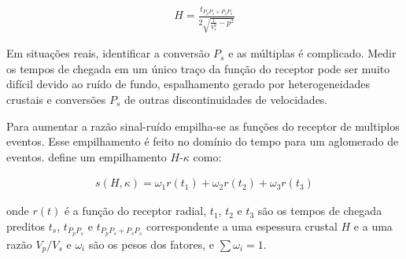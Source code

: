 \begin{eqnarray}
H = \frac{t_{P_{p}P_{s}+P_{s}P_{s}}}{{2\sqrt{\frac{1}{V_{s}^{2}}- p^{2}}}}
\end{eqnarray}

Em situações reais, identificar a conversão $P_{s}$ e as múltiplas é complicado. Medir os tempos de chegada em um único traço da função do receptor pode ser muito difícil devido ao ruído de fundo, espalhamento gerado por heterogeneidades crustais e conversões $P_{s}$ de outras discontinuidades de velocidades.

Para aumentar a razão sinal-ruído empilha-se as funções do receptor de multiplos eventos. Esse empilhamento é feito no domínio do tempo para um aglomerado de eventos. \cite{Zhu_Kanamori_2000} define um empilhamento $H$-$\kappa$ como:

\begin{eqnarray} \label{Hk_stack}
s(H,\kappa) = \omega_{1}r(t_{1}) + \omega_{2}r(t_{2}) + \omega_{3}r(t_{3})
\end{eqnarray}

onde $r(t)$ é a função do receptor radial, $t_{1}$, $t_{2}$ e $t_{3}$ são os tempos de chegada preditos  $t_{s}$,  $t_{P_{p}P_{s}}$ e  $t_{P_{p}P_{s}+P_{s}P_{s}}$ correspondente a uma espessura crustal $H$ e a uma razão $V_{p}/V_{s}$ e $\omega_{i}$ são os pesos dos fatores, e $\sum \omega_{i} = 1$. 

